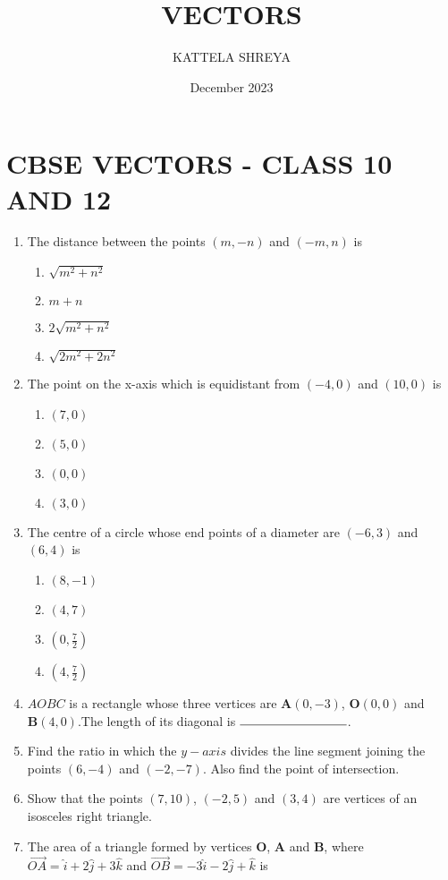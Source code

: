 \documentclass[12pt,-letter paper]{article}
\title{VECTORS}
\author{KATTELA SHREYA}
\date{December 2023}
\let\vec\mathbf{}
\let\vec\mathbf{}
\providecommand{\brak}[1]{\ensuremath{\left(#1\right)}}
\begin{document}
             
\maketitle
\section*{CBSE VECTORS - CLASS 10 AND 12}
\begin{enumerate}
\item The distance between the points $\brak{m,-n}$ and $\brak{-m, n}$ is
\begin{enumerate}
\item $\sqrt{m^{2} + n^{2}}$
\item $ m+n $
\item $ 2\sqrt{m^{2} + n^{2}}$
\item $\sqrt{2m^{2} + 2n^{2}}$
\end{enumerate}
\item The point on the x-axis which is equidistant from $\brak{-4,0}$ and $\brak{10,0}$ is
\begin{enumerate}             
\item $\brak{7,0}$
\item $\brak{5,0}$              
\item $\brak{0,0}$
\item $\brak{3,0}$
\end{enumerate}
\item The centre of a circle whose end points of a diameter are $\brak{-6,3}$ and $\brak{6,4}$ is
\begin{enumerate}
\item $\brak{8,-1}$
\item $\brak{4,7}$
\item $\brak{0,\frac{7}{2}}$
\item $\brak{4,\frac{7}{2}}$
\end{enumerate}
\item $AOBC$ is a rectangle whose three vertices are $\vec{A}\brak{0,-3}$, $\vec{O}\brak{0,0}$ and $\vec{B}\brak{4,0}$.The length of its diagonal is $\rule{3cm}{0.15mm}$.
\item Find the ratio in which the $y-axis$ divides the line segment joining the points $\brak{6,-4}$ and $\brak{-2, -7}$. Also find the point of intersection.
\item Show that the points $\brak{7, 10}$, $\brak{-2, 5}$ and $\brak{3, 4}$ are vertices of an isosceles right triangle.
\item The area of a triangle formed by vertices $\vec{O}$, $\vec{A}$ and $\vec{B}$, where $\overrightarrow{OA}= \hat{i}+2 \hat{j}+3\hat{k}$ and $\overrightarrow{OB}= -3\hat{i} - 2\hat{j} + \hat{k}$ is

\end{enumerate}
\end{document}
